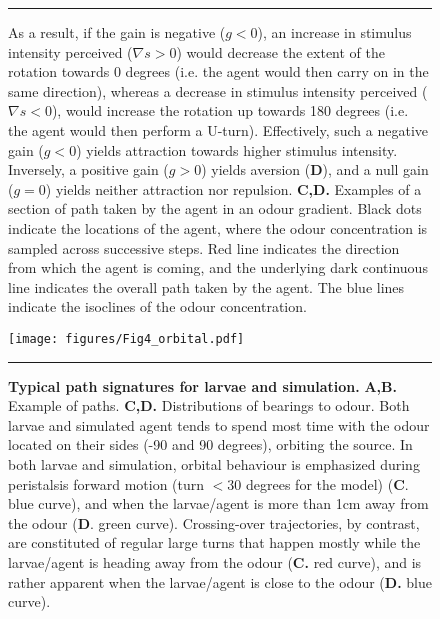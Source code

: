\documentclass[11pt,a4paper]{article}
\begin{document}
\begin{figure}
\ContinuedFloat
\caption{
As a result, if the gain is negative ($g<0$), an increase in stimulus intensity perceived ($\nabla s>0$) would decrease the extent of the rotation towards 0 degrees (i.e. the agent would then carry on in the same direction), whereas a decrease in stimulus intensity perceived ($\nabla s<0$), would increase the rotation up towards 180 degrees (i.e. the agent would then perform a U-turn). Effectively, such a negative gain ($g<0$) yields attraction towards higher stimulus intensity. Inversely, a positive gain ($g>0$) yields aversion ({\bf D}), and a null gain ($g=0$) yields neither attraction nor repulsion.
{\bf C,D.} Examples of a section of path taken by the agent in an odour gradient. Black dots indicate the locations of the agent, where the odour concentration is sampled across successive steps. Red line indicates the direction from which the agent is coming, and the underlying dark continuous line indicates the overall path taken by the agent. The blue lines indicate the isoclines of the odour concentration.
}
\hrule
\end{figure}


\begin{figure}
\begin{center}
\texttt{[image: figures/Fig4\_orbital.pdf]}
\caption{{\bf Typical path signatures for larvae and simulation.} {\bf A,B.} Example of paths. {\bf C,D.} Distributions of bearings to odour.
 Both larvae and simulated agent tends to spend most time with the odour located on their sides (-90 and 90 degrees), orbiting the source. In both larvae and simulation, orbital behaviour is emphasized during peristalsis forward motion (turn $<30$ degrees for the model) ({\bf C}. blue curve), and when the larvae/agent is more than 1cm away from the odour ({\bf D}. green curve). Crossing-over trajectories, by contrast, are constituted of regular large turns that happen mostly while the larvae/agent is heading away from the odour ({\bf C.} red curve), and is rather apparent when the larvae/agent is close to the odour ({\bf D.} blue curve).
\label{fig:PathSignatures}}
\hrule
\end{center}
\end{figure}
\end{document}
